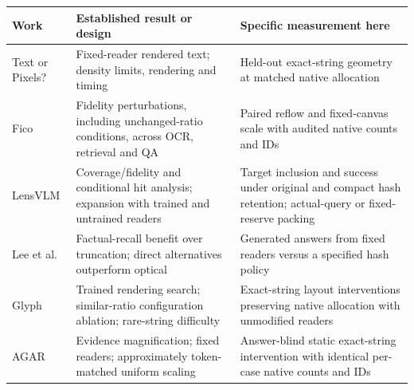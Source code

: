 \begingroup\setlength{\tabcolsep}{3pt}
\begin{tabular}{@{}>{\raggedright\arraybackslash}p{.80in}>{\raggedright\arraybackslash}p{2.11in}>{\raggedright\arraybackslash}p{2.05in}@{}}\toprule
Work & Established result or design & Specific measurement here\\\midrule
Text or Pixels? & Fixed-reader rendered text; density limits, rendering and timing & Held-out exact-string geometry at matched native allocation\\
Fico & Fidelity perturbations, including unchanged-ratio conditions, across OCR, retrieval and QA & Paired reflow and fixed-canvas scale with audited native counts and IDs\\
LensVLM & Coverage/fidelity and conditional hit analysis; expansion with trained and untrained readers & Target inclusion and success under original and compact hash retention; actual-query or fixed-reserve packing\\
Lee et al. & Factual-recall benefit over truncation; direct alternatives outperform optical & Generated answers from fixed readers versus a specified hash policy\\
Glyph & Trained rendering search; similar-ratio configuration ablation; rare-string difficulty & Exact-string layout interventions preserving native allocation with unmodified readers\\
AGAR & Evidence magnification; fixed readers; approximately token-matched uniform scaling & Answer-blind static exact-string intervention with identical per-case native counts and IDs\\\bottomrule
\end{tabular}\endgroup
